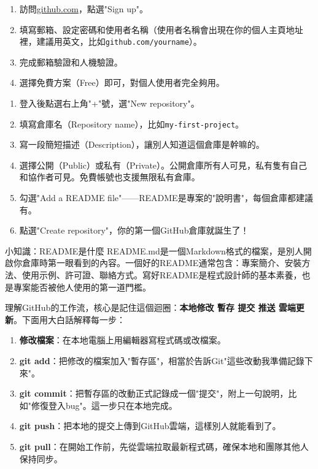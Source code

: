 

\begin{enumerate}
  \item 訪問\href{https://github.com}{github.com}，點選"Sign up"。
  \item 填寫郵箱、設定密碼和使用者名稱（使用者名稱會出現在你的個人主頁地址裡，建議用英文，比如\texttt{github.\allowbreak com/\allowbreak yourname}）。
  \item 完成郵箱驗證和人機驗證。
  \item 選擇免費方案（Free）即可，對個人使用者完全夠用。
\end{enumerate}


\begin{enumerate}
  \item 登入後點選右上角"+"號，選"New repository"。
  \item 填寫倉庫名（Repository name），比如\texttt{my-\allowbreak first-\allowbreak project}。
  \item 寫一段簡短描述（Description），讓別人知道這個倉庫是幹嘛的。
  \item 選擇公開（Public）或私有（Private）。公開倉庫所有人可見，私有隻有自己和協作者可見。免費帳號也支援無限私有倉庫。
  \item 勾選"Add a README file"——README是專案的"說明書"，每個倉庫都建議有。
  \item 點選"Create repository"，你的第一個GitHub倉庫就誕生了！
\end{enumerate}

\begin{tcbinfo}{小知識：README是什麼}
README.md是一個Markdown格式的檔案，是別人開啟你倉庫時第一眼看到的內容。一個好的README通常包含：專案簡介、安裝方法、使用示例、許可證、聯絡方式。寫好README是程式設計師的基本素養，也是專案能否被他人使用的第一道門檻。

\end{tcbinfo}


理解GitHub的工作流，核心是記住這個迴圈：\textbf{本地修改 暫存 提交 推送 雲端更新}。下面用大白話解釋每一步：

\begin{enumerate}
  \item \textbf{修改檔案}：在本地電腦上用編輯器寫程式碼或改檔案。
  \item \textbf{git add}：把修改的檔案加入"暫存區"，相當於告訴Git"這些改動我準備記錄下來"。
  \item \textbf{git commit}：把暫存區的改動正式記錄成一個"提交"，附上一句說明，比如"修復登入bug"。這一步只在本地完成。
  \item \textbf{git push}：把本地的提交上傳到GitHub雲端，這樣別人就能看到了。
  \item \textbf{git pull}：在開始工作前，先從雲端拉取最新程式碼，確保本地和團隊其他人保持同步。
\end{enumerate}

